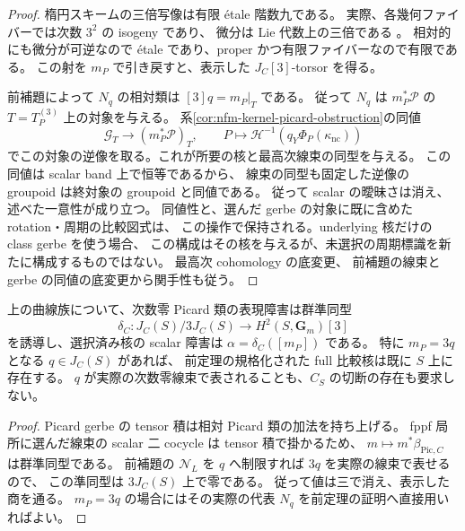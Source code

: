 \begin{proof}
楕円スキームの三倍写像は有限 \'etale 階数九である。
実際、各幾何ファイバーでは次数 $3^2$ の isogeny であり、
微分は Lie 代数上の三倍である
\cite[Tags~0BFG, 0BFH]{NFMStacksMultiplication}。
相対的にも微分が可逆なので \'etale であり、proper かつ有限ファイバーなので有限である。
この射を $m_P$ で引き戻すと、表示した $J_C[3]$-torsor を得る。

前補題によって $N_q$ の相対類は $[3]q=m_P|_T$ である。
従って $N_q$ は $m_P^*\mathscr P$ の $T=T_P^{(3)}$ 上の対象を与える。
系\ref{cor:nfm-kernel-picard-obstruction}の同値
\[
 \mathcal G_T\longrightarrow(m_P^*\mathscr P)_T,
 \qquad P\longmapsto
 \mathcal H^{-1}\!\left(q_Y\Phi_P(\kappa_{\mathrm{nc}})\right)
\]
でこの対象の逆像を取る。これが所要の核と最高次線束の同型を与える。
この同値は scalar band 上で恒等であるから、
線束の同型も固定した逆像の groupoid は終対象の groupoid と同値である。
従って scalar の曖昧さは消え、述べた一意性が成り立つ。
同値性と、選んだ gerbe の対象に既に含めた rotation・周期の比較図式は、
この操作で保持される。underlying 核だけの class gerbe を使う場合、
この構成はその核を与えるが、未選択の周期標識を新たに構成するものではない。
最高次 cohomology の底変更、
前補題の線束と gerbe の同値の底変更から関手性も従う。
\end{proof}

\begin{corollary}
\label{cor:nfm-kernel-picard-mod-three}
上の曲線族について、次数零 Picard 類の表現障害は群準同型
\[
 \delta_C:J_C(S)/3J_C(S)
       \longrightarrow H^2(S,\mathbf G_m)[3]
\]
を誘導し、選択済み核の scalar 障害は $\alpha=\delta_C([m_P])$ である。
特に $m_P=3q$ となる $q\in J_C(S)$ があれば、
前定理の規格化された full 比較核は既に $S$ 上に存在する。
$q$ が実際の次数零線束で表されることも、$C_S$ の切断の存在も要求しない。
\end{corollary}

\begin{proof}
Picard gerbe の tensor 積は相対 Picard 類の加法を持ち上げる。
fppf 局所に選んだ線束の scalar 二 cocycle は tensor 積で掛かるため、
$m\mapsto m^*\beta_{\mathrm{Pic},C}$ は群準同型である。
前補題の $\mathscr N_L$ を $q$ へ制限すれば $3q$ を実際の線束で表せるので、
この準同型は $3J_C(S)$ 上で零である。
従って値は三で消え、表示した商を通る。
$m_P=3q$ の場合にはその実際の代表 $N_q$ を前定理の証明へ直接用いればよい。
\end{proof}

